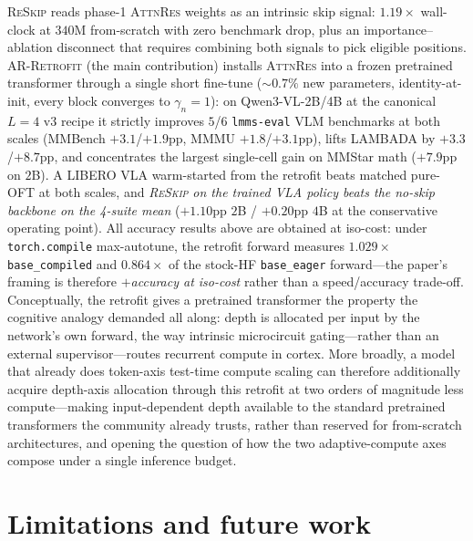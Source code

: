 \documentclass{article}
\newcommand{\attnres}{\textsc{AttnRes}}
\newcommand{\reskip}{\textsc{ReSkip}}
\newcommand{\retrofit}{\textsc{AR-Retrofit}}
\begin{document}
\reskip{} reads phase-1 \attnres{} weights as an intrinsic skip signal: $1.19\times$ wall-clock at $340$M from-scratch with zero benchmark drop, plus an importance--ablation disconnect that requires combining both signals to pick eligible positions. \retrofit{} (the main contribution) installs \attnres{} into a frozen pretrained transformer through a single short fine-tune ($\sim$$0.7\%$ new parameters, identity-at-init, every block converges to $\gamma_n{=}1$): on Qwen3-VL-2B/4B at the canonical $L{=}4$ v3 recipe it strictly improves $5$/$6$ \texttt{lmms-eval} VLM benchmarks at both scales (MMBench $+3.1$/$+1.9$pp, MMMU $+1.8$/$+3.1$pp), lifts LAMBADA by $+3.3$/$+8.7$pp, and concentrates the largest single-cell gain on MMStar math ($+7.9$pp on $2$B). A LIBERO VLA warm-started from the retrofit beats matched pure-OFT at both scales, and \emph{\reskip{} on the trained VLA policy beats the no-skip backbone on the 4-suite mean} ($+1.10$pp $2$B / $+0.20$pp $4$B at the conservative operating point). All accuracy results above are obtained at iso-cost: under \texttt{torch.compile} max-autotune, the retrofit forward measures $1.029\times$ \texttt{base\_compiled} and $0.864\times$ of the stock-HF \texttt{base\_eager} forward---the paper's framing is therefore \emph{$+$accuracy at iso-cost} rather than a speed/accuracy trade-off. Conceptually, the retrofit gives a pretrained transformer the property the cognitive analogy demanded all along: depth is allocated per input by the network's own forward, the way intrinsic microcircuit gating---rather than an external supervisor---routes recurrent compute in cortex. More broadly, a model that already does token-axis test-time compute scaling can therefore additionally acquire depth-axis allocation through this retrofit at two orders of magnitude less compute---making input-dependent depth available to the standard pretrained transformers the community already trusts, rather than reserved for from-scratch architectures, and opening the question of how the two adaptive-compute axes compose under a single inference budget.




\appendix
\section{Limitations and future work}
\label{app:limitations}
\end{document}
